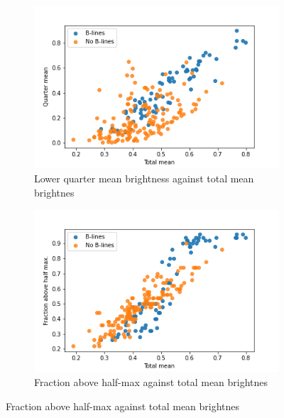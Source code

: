 \documentclass[11pt]{article} %
\begin{document}
	\begin{figure}
	\centering
		\begin{subfigure}{0.65\textwidth}
		\centering
		\includegraphics[width=\textwidth]{figuras/scores1_2.png}
		\caption{Lower quarter mean brightness against total mean brightnes}
		\end{subfigure}

		\begin{subfigure}{0.65\textwidth}
		\centering
		\includegraphics[width=\textwidth]{figuras/scores1_3.png}
		\caption{Fraction above half-max against total mean brightnes}
		\end{subfigure}


\end{figure}
\end{document}
